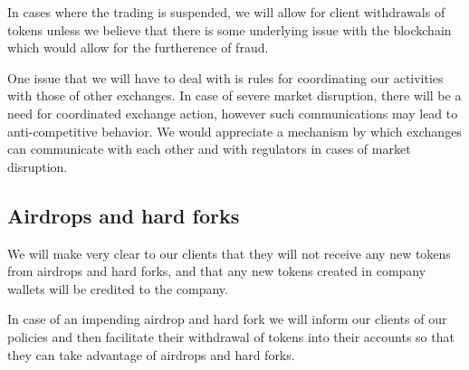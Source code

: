 In cases where the trading is suspended, we will allow for client
withdrawals of tokens unless we believe that there is some underlying
issue with the blockchain which would allow for the furtherence of
fraud.

One issue that we will have to deal with is rules for coordinating our
activities with those of other exchanges.  In case of severe market
disruption, there will be a need for coordinated exchange action,
however such communications may lead to anti-competitive behavior.  We
would appreciate a mechanism by which exchanges can communicate with
each other and with regulators in cases of market disruption.

\subsection{Airdrops and hard forks}
We will make very clear to our clients that they will not receive any
new tokens from airdrops and hard forks, and that any new tokens
created in company wallets will be credited to the company.

In case of an impending airdrop and hard fork we will inform our
clients of our policies and then facilitate their withdrawal of tokens
into their accounts so that they can take advantage of airdrops and
hard forks.



